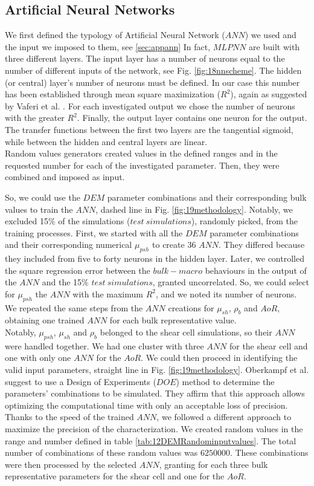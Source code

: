 \subsection{Artificial Neural Networks}
\label{subsec:ann}
We first defined the typology of Artificial Neural Network ($ANN$) we used and
the input we imposed to them, see \ref{sec:appann}
In fact, $MLPNN$ are built with three different layers. 
The input layer has a number of neurons equal to the number of different inputs
of the network, see Fig. \ref{fig:18nnscheme}.
The hidden (or central) layer's number of neurons must be defined. 
In our case this number has been established through mean square maximization ($R^2$), 
again as suggested by Vaferi et al. \cite{RefWorks:150}. 
For each investigated output we chose the number of neurons with the greater $R^2$.
Finally, the output layer contains one neuron for the output.
The transfer functions between the first two layers are the tangential sigmoid, 
while between the hidden and central layers are linear.\\
Random values generators created values in the defined ranges and in the requested 
number for each of the investigated parameter. Then, they were combined and imposed as input.


So, we could use the $DEM$ parameter combinations and their corresponding bulk
values to train the $ANN$,
dashed line in Fig. \ref{fig:19methodology}.
Notably, we excluded 15\% of the simulations ($test ~ simulations$),
randomly picked, from the training processes.
First, we started with all the $DEM$ parameter combinations and their corresponding numerical $\mu_{psh}$ to create 36 $ANN$. 
They differed because they included from five to forty neurons in the hidden
layer.
Later, we controlled the square regression error between the $bulk-macro$ behaviours in the output of 
the $ANN$ and the 15\% $test ~ simulations$, granted uncorrelated. 
So, we could select for $\mu_{psh}$ the $ANN$ with the maximum $R^2$, and we noted its number of neurons. 
We repeated the same steps from the $ANN$ creations for $\mu_{sh}$, $\rho_b$ and $AoR$, 
obtaining one trained $ANN$ for each bulk representative value. \\
Notably, $\mu_{psh}$, $\mu_{sh}$ and $\rho_b$ belonged to the shear cell
simulations, so their $ANN$ were handled together. 
We had one cluster with three $ANN$ for the shear cell and one with only one $ANN$
for the $AoR$.
We could then proceed in identifying the valid input parameters, straight line
in Fig. \ref{fig:19methodology}.
Oberkampf et al. \cite{RefWorks:160} suggest to use a Design of Experiments
($DOE$) method to determine the parameters' combinations to be simulated.
They affirm that this approach allows optimizing the computational time with
only an acceptable loss of precision.
Thanks to the speed of the trained $ANN$, we followed a different approach to
maximize the precision of the characterization.
We created random values
in the range and number defined in table \ref{tab:12DEMRandominputvalues}.
The total number of combinations of these random values was $6250000$. These
combinations were then processed by the selected $ANN$, granting for each three bulk representative parameters for the shear cell and one for the $AoR$. 

